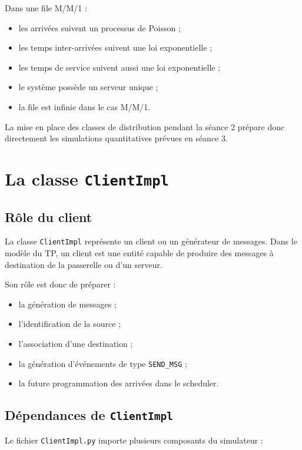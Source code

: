 \documentclass{article}
\begin{document}
Dans une file M/M/1 :
\begin{itemize}[leftmargin=*]
    \item les arrivées suivent un processus de Poisson ;
    \item les temps inter-arrivées suivent une loi exponentielle ;
    \item les temps de service suivent aussi une loi exponentielle ;
    \item le système possède un serveur unique ;
    \item la file est infinie dans le cas M/M/1.
\end{itemize}

La mise en place des classes de distribution pendant la séance 2 prépare donc directement les simulations quantitatives prévues en séance 3.

\section{La classe \texttt{ClientImpl}}

\subsection{Rôle du client}

La classe \texttt{ClientImpl} représente un client ou un générateur de messages. Dans le modèle du TP, un client est une entité capable de produire des messages à destination de la passerelle ou d’un serveur.

Son rôle est donc de préparer :
\begin{itemize}[leftmargin=*]
    \item la génération de messages ;
    \item l’identification de la source ;
    \item l’association d’une destination ;
    \item la génération d’événements de type \texttt{SEND\_MSG} ;
    \item la future programmation des arrivées dans le scheduler.
\end{itemize}

\subsection{Dépendances de \texttt{ClientImpl}}

Le fichier \texttt{ClientImpl.py} importe plusieurs composants du simulateur :
\end{document}
